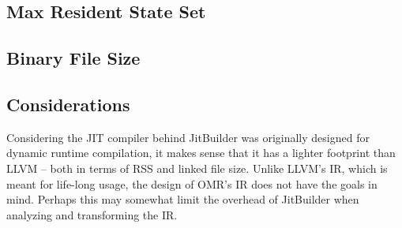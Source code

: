 \subsection{Max Resident State Set}

\subsection{Binary File Size}

\subsection{Considerations}
Considering the JIT compiler behind JitBuilder was originally designed for dynamic runtime compilation, it makes sense that it has a lighter footprint than LLVM -- both in terms of RSS and linked file size.
Unlike LLVM's IR, which is meant for life-long usage, the design of OMR's IR does not have the goals in mind.
Perhaps this may somewhat limit the overhead of JitBuilder when analyzing and transforming the IR.
